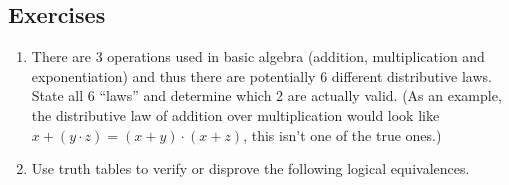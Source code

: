\documentclass[10pt,]{book}
\theoremstyle{plain}
\theoremstyle{definition}
\theoremstyle{definition}
\numberwithin{equation}{section}
\newcommand{\hrulethin}  {\noalign{\hrule height 0.04em}}
\newcommand{\hint}[1]{ }
\DeclareMathOperator{\caret}{$\scriptstyle\wedge$}
\begin{document}
\subsection[{Exercises}]{Exercises}\label{exercises-10}
\leavevmode%
\begin{enumerate}[label=(\alph*)]
\item\hypertarget{li-134}{}
        There are 3 operations used in basic algebra (addition, 
        multiplication and exponentiation) and thus
        there are potentially 6 different distributive laws.  State
        all 6 ``laws'' and determine which 2 are actually valid.
        (As an example, the distributive law of addition over multiplication
        would look like \(x + (y \cdot z) = (x + y) \cdot (x + z)\), this isn't 
        one of the true ones.) 



        \hint{


        These ``laws'' should probably be layed-out in a big 3 by 3 table. Such a table would of course have 9 cells, but we won't be using the cells on the diagonal because they would involve an operation distributing over itself. (That can't happen, can it?)
        I'm going to put a few of the entries in, and you do the rest.
        \begin{tabular}{llll}
&\(+\)&\(\ast\)&\(\caret\)\tabularnewline[0pt]
&&&\tabularnewline\hrulethin
\(+\)&\(\emptyset\)&\text{
            \begin{gather*}
x+(y\ast z)\\
= (x+y) \ast (x+z)
\end{gather*}
            }&\text{
            \begin{gather*}
x+(y^z)\\
= (x+y)^{(x+z)}
\end{gather*}
            }\tabularnewline[0pt]
&&&\tabularnewline\hrulethin
\(\ast\)&\text{
            \begin{gather*}
x \ast (y+z)\\
= (x \ast y) + (x \ast z)
\end{gather*}
            }&\(\emptyset\)&\tabularnewline[0pt]
&&&\tabularnewline\hrulethin
\(\caret\)&&&\(\emptyset\)\tabularnewline[0pt]
&&&\tabularnewline\hrulethin
\end{tabular}

        }
\item\hypertarget{li-135}{}
    Use truth tables to verify or disprove the following 
    logical equivalences.


\end{enumerate}
\end{document}
